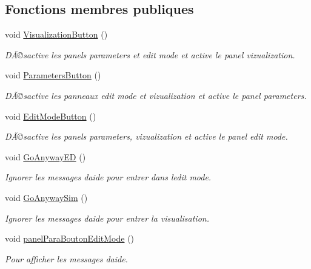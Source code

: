 \subsection*{Fonctions membres publiques}
\begin{DoxyCompactItemize}
\item 
void \mbox{\hyperlink{class_navigation_ad4dbf103497aef10cc636c40f84dbdde}{Visualization\+Button}} ()
\begin{DoxyCompactList}\small\item\em DÃ©sactive les panels parameters et edit mode et active le panel vizualization. \end{DoxyCompactList}\item 
void \mbox{\hyperlink{class_navigation_adf000d0931e06c79e1e66f266d93e313}{Parameters\+Button}} ()
\begin{DoxyCompactList}\small\item\em DÃ©sactive les panneaux edit mode et vizualization et active le panel parameters. \end{DoxyCompactList}\item 
void \mbox{\hyperlink{class_navigation_af687f3df18da0e95175b04fe5cc7da56}{Edit\+Mode\+Button}} ()
\begin{DoxyCompactList}\small\item\em DÃ©sactive les panels parameters, vizualization et active le panel edit mode. \end{DoxyCompactList}\item 
void \mbox{\hyperlink{class_navigation_a17942535e76d66a1d290f9e7a2bc03ec}{Go\+Anyway\+ED}} ()
\begin{DoxyCompactList}\small\item\em Ignorer les messages d\textquotesingle{}aide pour entrer dans l\textquotesingle{}edit mode. \end{DoxyCompactList}\item 
void \mbox{\hyperlink{class_navigation_a4ea15dd4ea6a5789b4786150d534fc10}{Go\+Anyway\+Sim}} ()
\begin{DoxyCompactList}\small\item\em Ignorer les messages d\textquotesingle{}aide pour entrer la visualisation. \end{DoxyCompactList}\item 
void \mbox{\hyperlink{class_navigation_a9a7bb527269069e0c083ef70291d4fb3}{panel\+Para\+Bouton\+Edit\+Mode}} ()
\begin{DoxyCompactList}\small\item\em Pour afficher les messages d\textquotesingle{}aide. \end{DoxyCompactList}\item 

\end{DoxyCompactItemize}
